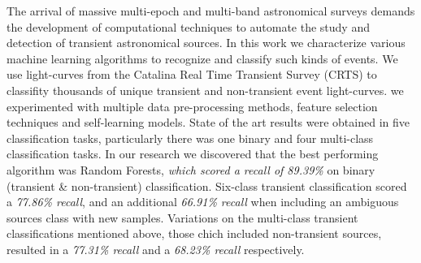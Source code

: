 

The arrival of massive multi-epoch and multi-band astronomical surveys
demands the development of computational techniques to automate the
study and detection of transient astronomical sources. 
In this work we characterize various machine learning algorithms to
recognize and classify such kinds of events.
We use light-curves from the Catalina Real Time Transient Survey
(CRTS) to classifity thousands of unique transient and non-transient
event light-curves.
we experimented  with multiple data pre-processing methods,
feature selection techniques and self-learning models. State of the
art results were obtained in five classification tasks, particularly
there was one binary and four multi-class classification tasks. In our
research we discovered that the best performing algorithm was Random
Forests, \textit{which scored a recall of 89.39\%} on binary
(transient \& non-transient) classification. Six-class transient
classification scored a \textit{77.86\% recall}, and an
additional \textit{66.91\% recall} when including an ambiguous sources
class with new samples. Variations on the multi-class transient
classifications mentioned above, those chich included non-transient
sources, resulted in a \textit{77.31\% recall} and a \textit{68.23\%
recall} respectively.   
